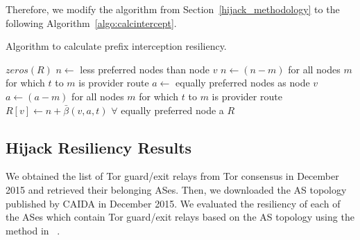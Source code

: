 Therefore, we modify the algorithm from Section~\ref{hijack_methodology} to the following Algorithm~\ref{algo:calcintercept}. 

\begin{algorithm}
\caption{Algorithm to calculate prefix interception resiliency.}
\label{algo:calcintercept}
\begin{algorithmic}
    \State {}
    \State $zeros(R)$
		\State $n \gets$ less preferred nodes than node $v$
			\State $n \gets (n - m)$ for all nodes $m$ for which $t$ to $m$ is provider route
		\EndIf
		\State $a \gets$ equally preferred nodes as node $v$
			\State $a \gets (a - m)$ for all nodes $m$ for which $t$ to $m$ is provider route
		\EndIf
		\State $R[v] \gets n + \bar{\beta}(v,a,t)$ $\forall$ equally preferred node a
	\EndIf
    \EndFor
    \State \Return $R$
\EndFunction
\end{algorithmic}
\end{algorithm}


\subsection{Hijack Resiliency Results}

We obtained the list of Tor guard/exit relays from Tor consensus in December 2015 and retrieved their belonging ASes. Then, we downloaded the AS topology published by CAIDA in December 2015. We evaluated the resiliency of each of the ASes which contain Tor guard/exit relays based on the AS topology using the method in ~\cite{lad2007understanding}. 


